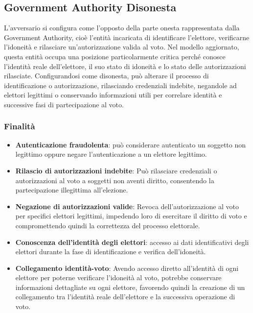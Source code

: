 \documentclass[a4paper,12pt]{article}
\begin{document}
\subsection{Government Authority Disonesta}

L'avversario si configura come l'opposto della parte onesta rappresentata dalla
Government Authority, cioè l'entità incaricata di identificare l'elettore, verificarne
l'idoneità e rilasciare un'autorizzazione valida al voto. Nel modello aggiornato,
questa entità occupa una posizione particolarmente critica perché conosce
l'identità reale dell'elettore, il suo stato di idoneità e lo stato delle autorizzazioni
rilasciate. Configurandosi come disonesta, può alterare il processo di
identificazione o autorizzazione, rilasciando credenziali indebite, negandole ad
elettori legittimi o conservando informazioni utili per correlare identità e
successive fasi di partecipazione al voto.
\subsubsection*{Finalità}

\begin{itemize}
    \item \textbf{Autenticazione fraudolenta}: può considerare autenticato un soggetto non legittimo oppure negare l'autenticazione a un elettore legittimo.
    \item \textbf{Rilascio di autorizzazioni indebite}: Può rilasciare credenziali o autorizzazioni al voto a soggetti non aventi diritto, consentendo la partecipazione illegittima all'elezione.

    \item \textbf{Negazione di autorizzazioni valide}: Revoca dell'autorizzazione al voto per specifici elettori legittimi, impedendo loro di esercitare il diritto di voto e compromettendo quindi la correttezza del processo elettorale.

    \item \textbf{Conoscenza dell'identità degli elettori}: accesso ai dati identificativi
    degli elettori durante la fase di identificazione e verifica dell'idoneità.
    \item \textbf{Collegamento identità-voto}: Avendo accesso diretto all'identità di ogni elettore per poterne verificare l'idoneità al voto, potrebbe conservare informazioni dettagliate su ogni elettore, favorendo quindi la creazione di un collegamento tra l'identità reale dell'elettore e la successiva operazione di voto.
\end{itemize}
\end{document}

